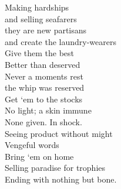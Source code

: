 Making hardships\\
and selling seafarers\\
they are new partisans\\
and create the laundry-wearers\\

Give them the best\\
Better than deserved\\
Never a moments rest\\
the whip was reserved\\

Get `em to the stocks\\
No light; a skin immune\\
None given. In shock.\\
Seeing product without might\\

Vengeful words\\
Bring `em on home\\
Selling paradise for trophies\\
Ending with nothing but bone.\\


